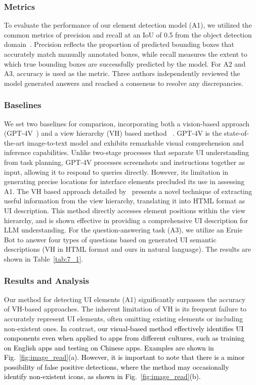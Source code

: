 \subsubsection{Metrics}
To evaluate the performance of our element detection model (A1), we utilized the common metrics of precision and recall at an IoU of 0.5 from the object detection domain~\cite{bunian2021vins}. Precision reflects the proportion of predicted bounding boxes that accurately match manually annotated boxes, while recall measures the extent to which true bounding boxes are successfully predicted by the model. For A2 and A3, accuracy is used as the metric. Three authors independently reviewed the model generated answers and reached a consensus to resolve any discrepancies. 

\subsubsection{Baselines}
We set two baselines for comparison, incorporating both a vision-based approach (GPT-4V~\cite{OpenAIGPT4V2023}) and a view hierarchy (VH) based method ~\cite{wang2023enabling}. GPT-4V is the state-of-the-art image-to-text model and exhibits remarkable visual comprehension and inference capabilities. Unlike two-stage processes that separate UI understanding from task planning, GPT-4V processes screenshots and instructions together as input, allowing it to respond to queries directly. However, its limitation in generating precise locations for interface elements precluded its use in assessing A1. The VH based approach detailed by~\cite{wang2023enabling} presents a novel technique of extracting useful information from the view hierarchy, translating it into HTML format as UI description. This method directly accesses element positions within the view hierarchy, and is shown effective in providing a comprehensive UI description for LLM understanding. For the question-answering task (A3), we utilize an Ernie Bot to answer four types of questions based on generated UI semantic descriptions  (VH in HTML format and ours in natural language). The results are shown in Table~\ref{tab:7_1}.

\subsubsection{Results and Analysis}

Our method for detecting UI elements (A1) significantly surpasses the accuracy of VH-based approaches. The inherent limitation of VH is its frequent failure to accurately represent UI elements, often omitting existing elements or including non-existent ones. In contrast, \textcolor{black}{our visual-based method effectively identifies UI components even when applied to apps from different cultures, such as training on English apps and testing on Chinese apps. Examples are shown in Fig.~\ref{fig:image_read}(a). However, it is important to note that there is a minor possibility of false positive detections, where the method may occasionally identify non-existent icons, as shown in Fig.~\ref{fig:image_read}(b).}

